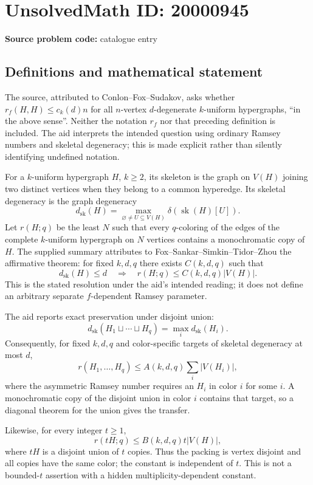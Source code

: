 \documentclass[11pt]{article}
\begin{document}
\section*{UnsolvedMath ID: 20000945}
\textbf{Source problem code:} catalogue entry
\subsection{Definitions and mathematical statement}
The source, attributed to Conlon--Fox--Sudakov, asks whether $r_f(H,H)\leq c_k(d)n$ for all $n$-vertex $d$-degenerate $k$-uniform hypergraphs, ``in the above sense''. Neither the notation $r_f$ nor that preceding definition is included. The aid interprets the intended question using ordinary Ramsey numbers and skeletal degeneracy; this is made explicit rather than silently identifying undefined notation.

For a $k$-uniform hypergraph $H$, $k\geq2$, its skeleton is the graph on $V(H)$ joining two distinct vertices when they belong to a common hyperedge. Its skeletal degeneracy is the graph degeneracy
\[
 d_{\mathrm{sk}}(H)=\max_{\varnothing\neq U\subseteq V(H)}
      \delta(\operatorname{sk}(H)[U]).
\]
Let $r(H;q)$ be the least $N$ such that every $q$-coloring of the edges of the complete $k$-uniform hypergraph on $N$ vertices contains a monochromatic copy of $H$. The supplied summary attributes to Fox--Sankar--Simkin--Tidor--Zhou the affirmative theorem: for fixed $k,d,q$ there exists $C(k,d,q)$ such that
\[
 d_{\mathrm{sk}}(H)\leq d\quad\Longrightarrow\quad
 r(H;q)\leq C(k,d,q)|V(H)|.
\]
This is the stated resolution under the aid's intended reading; it does not define an arbitrary separate $f$-dependent Ramsey parameter.

The aid reports exact preservation under disjoint union:
\[
 d_{\mathrm{sk}}(H_1\sqcup\cdots\sqcup H_q)
 =\max_i d_{\mathrm{sk}}(H_i).
\]
Consequently, for fixed $k,d,q$ and color-specific targets of skeletal degeneracy at most $d$,
\[
 r(H_1,\ldots,H_q)\leq A(k,d,q)\sum_i|V(H_i)|,
\]
where the asymmetric Ramsey number requires an $H_i$ in color $i$ for some $i$. A monochromatic copy of the disjoint union in color $i$ contains that target, so a diagonal theorem for the union gives the transfer.

Likewise, for every integer $t\geq1$,
\[
 r(tH;q)\leq B(k,d,q)t|V(H)|,
\]
where $tH$ is a disjoint union of $t$ copies. Thus the packing is vertex disjoint and all copies have the same color; the constant is independent of $t$. This is not a bounded-$t$ assertion with a hidden multiplicity-dependent constant.
\end{document}

